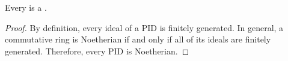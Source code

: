 \begin{proposition} \label{proposition:pids_are_noetherian}
    Every  is a .
\end{proposition}
\begin{proof}
    By definition, every ideal of a PID is finitely generated. In general, a commutative ring is Noetherian if and only if all of its ideals are finitely generated. Therefore, every PID is Noetherian.
\end{proof}